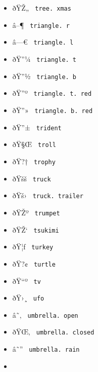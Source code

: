 \begin{itemize}
\item
  \label{symbol-tree.xmas}{{ ðŸŽ„ }
  \texttt{\ tree.\ xmas\ }}
\item
  \label{symbol-triangle.r}{{ â--¶ }
  \texttt{\ triangle.\ r\ }}
\item
  \label{symbol-triangle.l}{{ â---€ }
  \texttt{\ triangle.\ l\ }}
\item
  \label{symbol-triangle.t}{{ ðŸ''¼ }
  \texttt{\ triangle.\ t\ }}
\item
  \label{symbol-triangle.b}{{ ðŸ''½ }
  \texttt{\ triangle.\ b\ }}
\item
  \label{symbol-triangle.t.red}{{ ðŸ''º }
  \texttt{\ triangle.\ t.\ red\ }}
\item
  \label{symbol-triangle.b.red}{{ ðŸ''» }
  \texttt{\ triangle.\ b.\ red\ }}
\item
  \label{symbol-trident}{{ ðŸ''± } \texttt{\ trident\ }}
\item
  \label{symbol-troll}{{ ðŸ§Œ } \texttt{\ troll\ }}
\item
  \label{symbol-trophy}{{ ðŸ?† } \texttt{\ trophy\ }}
\item
  \label{symbol-truck}{{ ðŸšš } \texttt{\ truck\ }}
\item
  \label{symbol-truck.trailer}{{ ðŸš› }
  \texttt{\ truck.\ trailer\ }}
\item
  \label{symbol-trumpet}{{ ðŸŽº } \texttt{\ trumpet\ }}
\item
  \label{symbol-tsukimi}{{ ðŸŽ` } \texttt{\ tsukimi\ }}
\item
  \label{symbol-turkey}{{ ðŸ¦ƒ } \texttt{\ turkey\ }}
\item
  \label{symbol-turtle}{{ ðŸ?¢ } \texttt{\ turtle\ }}
\item
  \label{symbol-tv}{{ ðŸ``º } \texttt{\ tv\ }}
\item
  \label{symbol-ufo}{{ ðŸ›¸ } \texttt{\ ufo\ }}
\item
  \label{symbol-umbrella.open}{{ â˜‚ }
  \texttt{\ umbrella.\ open\ }}
\item
  \label{symbol-umbrella.closed}{{ ðŸŒ‚ }
  \texttt{\ umbrella.\ closed\ }}
\item
  \label{symbol-umbrella.rain}{{ â˜'' }
  \texttt{\ umbrella.\ rain\ }}
\item

\end{itemize}
